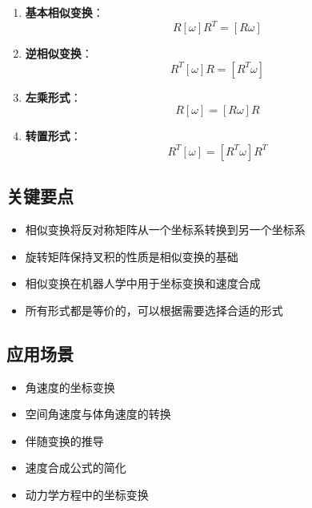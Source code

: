 \documentclass[12pt,a4paper]{article}
\begin{document}
\begin{enumerate}
\item \textbf{基本相似变换}：
\begin{equation}
R [\omega] R^T = [R \omega]
\end{equation}

\item \textbf{逆相似变换}：
\begin{equation}
R^T [\omega] R = [R^T \omega]
\end{equation}

\item \textbf{左乘形式}：
\begin{equation}
R [\omega] = [R \omega] R
\end{equation}

\item \textbf{转置形式}：
\begin{equation}
R^T [\omega] = [R^T \omega] R^T
\end{equation}
\end{enumerate}

\subsection{关键要点}

\begin{itemize}
\item 相似变换将反对称矩阵从一个坐标系转换到另一个坐标系
\item 旋转矩阵保持叉积的性质是相似变换的基础
\item 相似变换在机器人学中用于坐标变换和速度合成
\item 所有形式都是等价的，可以根据需要选择合适的形式
\end{itemize}

\subsection{应用场景}

\begin{itemize}
\item 角速度的坐标变换
\item 空间角速度与体角速度的转换
\item 伴随变换的推导
\item 速度合成公式的简化
\item 动力学方程中的坐标变换
\end{itemize}
\end{document}
